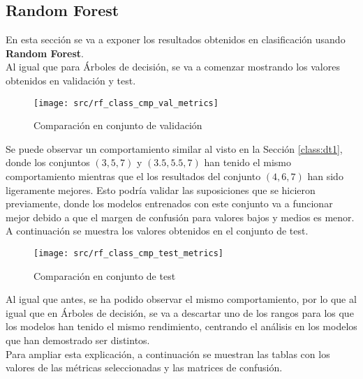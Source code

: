 \subsection{Random Forest}
En esta sección se va a exponer los resultados obtenidos en clasificación usando \textbf{Random Forest}.\\
Al igual que para Árboles de decisión, se va a comenzar mostrando los valores obtenidos en validación y test.
\begin{figure}[H]
	\centering
	\texttt{[image: src/rf\_class\_cmp\_val\_metrics]}
	\caption{Comparación en conjunto de validación}
	\label{fig:rf_class_cmp_val}
\end{figure}
Se puede observar un comportamiento similar al visto en la Sección \ref{class:dt1}, donde los conjuntos $(3,5,7)$ y $(3.5,5.5,7)$ han tenido el mismo comportamiento mientras que el los resultados del conjunto $(4,6,7)$ han sido ligeramente mejores. Esto podría validar las suposiciones que se hicieron previamente, donde los modelos entrenados con este conjunto va a funcionar mejor debido a que el margen de confusión para valores bajos y medios es menor.\\
\clearpage
A continuación se muestra los valores obtenidos en el conjunto de test.
\begin{figure}[H]
	\centering
	\texttt{[image: src/rf\_class\_cmp\_test\_metrics]}
	\caption{Comparación en conjunto de test}
	\label{fig:rf_class_cmp_test}
\end{figure}
Al igual que antes, se ha podido observar el mismo comportamiento, por lo que al igual que en Árboles de decisión, se va a descartar uno de los rangos para los que los modelos han tenido el mismo rendimiento, centrando el análisis en los modelos que han demostrado ser distintos.\\
\linebreak
Para ampliar esta explicación, a continuación se muestran las tablas con los valores de las métricas seleccionadas y las matrices de confusión.
\clearpage
